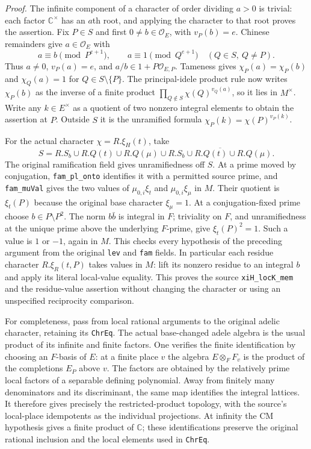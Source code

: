\emph{Proof.}
The infinite component of a character of order dividing $a>0$ is trivial:
each factor $\mathbb C^\times$ has an $a$th root, and applying the
character to that root proves the assertion.  Fix $P\in S$ and first
$0\ne b\in\mathcal O_E$, with $v_P(b)=e$.  Chinese remainders give
$a\in\mathcal O_E$ with
\[
 a\equiv b\pmod {P^{e+1}},\qquad
 a\equiv1\pmod {Q^{e+1}}\quad(Q\in S,\ Q\ne P).               \tag{RTG.3}
\]
Thus $a\ne0$, $v_P(a)=e$, and $a/b\in1+P\mathcal O_{E,P}$.
Tameness gives $\chi_P(a)=\chi_P(b)$ and $\chi_Q(a)=1$ for
$Q\in S\setminus\{P\}$.  The principal-idele product rule now writes
$\chi_P(b)$ as the inverse of a finite product
\(\prod_{Q\notin S}\chi(Q)^{v_Q(a)}\), so it lies in $M^\times$.
Write any $k\in E^\times$ as a quotient of two nonzero integral
elements to obtain the assertion at $P$.  Outside $S$ it is the
unramified formula $\chi_P(k)=\chi(P)^{v_P(k)}$.

For the actual character $\chi=R.\xi_H(t)$, take
\[
 S=R.S_b\cup R.Q(t)\cup R.Q(\mu)
       \cup\overline{R.S_b\cup R.Q(t)\cup R.Q(\mu)}.
\]
The original ramification field gives unramifiedness off $S$.
At a prime moved by conjugation, \texttt{fam\_\allowbreak pl\_\allowbreak onto} identifies it
with a permitted source prime, and \texttt{fam\_\allowbreak muVal} gives the two
values of $\mu_{0,i}\xi_t$ and $\mu_{0,i}\xi_\mu$ in $M$.
Their quotient is $\xi_t(P)$ because the original base character
$\xi_\mu=1$.  At a conjugation-fixed prime choose
$b\in P\setminus P^2$.  The norm $b\bar b$ is integral in $F$;
triviality on $F$, and unramifiedness at the unique prime above the
underlying $F$-prime, give $\xi_t(P)^2=1$.  Such a value is $1$ or
$-1$, again in $M$.  This checks every hypothesis of the preceding
argument from the original \texttt{lev} and \texttt{fam} fields.
In particular each residue character $R.\xi_R(t,P)$ takes values in
$M$: lift its nonzero residue to an integral $b$ and apply its literal
local-value equality.  This proves the source
\texttt{xiH\_\allowbreak locK\_\allowbreak mem} and the residue-value assertion without changing
the character or using an unspecified reciprocity comparison.

For completeness, pass from local rational arguments to the original
adelic character, retaining its \texttt{ChrEq}.  The actual base-changed
adele algebra is the usual product of its infinite and finite factors.
One verifies the finite identification by choosing an $F$-basis of $E$:
at a finite place $v$ the algebra
$E\otimes_FF_v$ is the product of the completions $E_P$ above $v$.
The factors are obtained by the relatively prime local factors of a
separable defining polynomial.  Away from finitely many denominators
and its discriminant, the same map identifies the integral lattices.
It therefore gives precisely the restricted-product topology, with
the source's local-place idempotents as the individual projections.
At infinity the CM hypothesis gives a finite product of
$\mathbb C$; these identifications preserve the original rational
inclusion and the local elements used in \texttt{ChrEq}.

